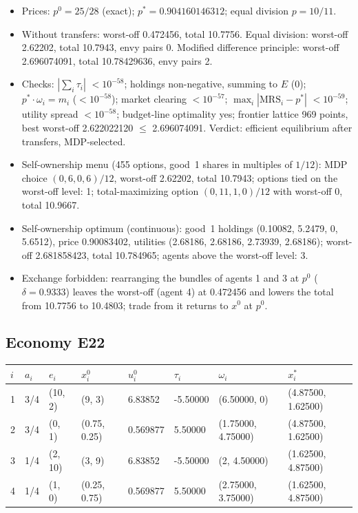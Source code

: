 \begin{itemize}[leftmargin=1.2em,itemsep=0pt,topsep=2pt]\footnotesize
\item Prices: $p^0 = 25/28$ (exact); $p^* = 0.904160146312$; equal division $p = 10/11$.
\item Without transfers: worst-off 0.472456, total 10.7756. Equal division: worst-off 2.62202, total 10.7943, envy pairs 0. Modified difference principle: worst-off 2.696074091, total 10.78429636, envy pairs 2.
\item Checks: $|\sum_i\tau_i|$ $<10^{-58}$; holdings non-negative, summing to $E$ (0); $p^*\cdot\omega_i = m_i$ ($<10^{-58}$); market clearing $<10^{-57}$; $\max_i|\mathrm{MRS}_i - p^*|$ $<10^{-59}$; utility spread $<10^{-58}$; budget-line optimality yes; frontier lattice 969 points, best worst-off 2.622022120 $\leq$ 2.696074091. Verdict: efficient equilibrium after transfers, MDP-selected.
\item Self-ownership menu (455 options, good~1 shares in multiples of $1/12$): MDP choice $(0, 6, 0, 6)/12$, worst-off 2.62202, total 10.7943; options tied on the worst-off level: 1; total-maximizing option $(0, 11, 1, 0)/12$ with worst-off 0, total 10.9667.
\item Self-ownership optimum (continuous): good~1 holdings (0.10082, 5.2479, 0, 5.6512), price 0.90083402, utilities (2.68186, 2.68186, 2.73939, 2.68186); worst-off 2.681858423, total 10.784965; agents above the worst-off level: 3.
\item Exchange forbidden: rearranging the bundles of agents 1 and 3 at $p^0$ ($\delta = 0.9333$) leaves the worst-off (agent 4) at 0.472456 and lowers the total from 10.7756 to 10.4803; trade from it returns to $x^0$ at $p^0$.
\end{itemize}

\subsection*{Economy E22}
\label{ec:E22}
{\scriptsize\setlength{\tabcolsep}{3pt}
\begin{tabular}{@{}llllllll@{}}
\toprule
$i$ & $a_i$ & $e_i$ & $x^0_i$ & $u^0_i$ & $\tau_i$ & $\omega_i$ & $x^*_i$ \\
\midrule
1 & 3/4 & (10, 2) & (9, 3) & 6.83852 & -5.50000 & (6.50000, 0) & (4.87500, 1.62500) \\
2 & 3/4 & (0, 1) & (0.75, 0.25) & 0.569877 & 5.50000 & (1.75000, 4.75000) & (4.87500, 1.62500) \\
3 & 1/4 & (2, 10) & (3, 9) & 6.83852 & -5.50000 & (2, 4.50000) & (1.62500, 4.87500) \\
4 & 1/4 & (1, 0) & (0.25, 0.75) & 0.569877 & 5.50000 & (2.75000, 3.75000) & (1.62500, 4.87500) \\
\bottomrule\end{tabular}}

